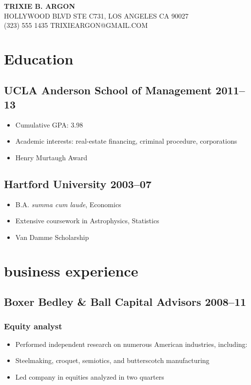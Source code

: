 \documentclass[11pt]{article}
\begin{document}
\begin{center}
  \asans\MakeUppercase{
  {\LARGE\textbf{Trixie B. Argon}} \\  Hollywood Blvd Ste C731, Los Angeles Ca 90027 \\
  (323) 555 1435 \quad trixieargon@gmail.com }
\end{center}

\section{Education}
	\subsection{UCLA Anderson School of Management \hfill 2011–13}
	\begin{itemize}
		\item Cumulative GPA: 3.98
		\item Academic interests: real-estate financing, criminal procedure, corporations
		\item Henry Murtaugh Award
	\end{itemize}
	
	\subsection{Hartford University \hfill 2003–07}
	\begin{itemize}
		\item B.A. \textit{summa cum laude}, Economics
		\item Extensive coursework in Astrophysics, Statistics
		\item Van Damme Scholarship
	\end{itemize}
	
\section{business experience}
	\subsection{Boxer Bedley \& Ball Capital Advisors \hfill 2008–11}
	\subsubsection{Equity analyst}
	\begin{itemize}
		\item Performed independent research on numerous American industries, including:
		\item Steelmaking, croquet, semiotics, and butterscotch manufacturing
		\item Led company in equities analyzed in two quarters
	\end{itemize}
	
\end{document}
